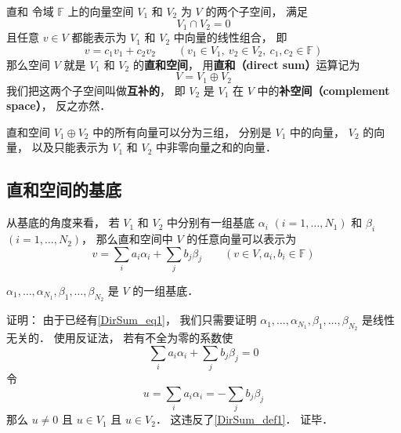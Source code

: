 
\begin{issues}
\issueTODO
\end{issues}

\begin{definition}{直和}\label{DirSum_def1}
令域 $\mathbb F$ 上的向量空间 $V_1$ 和 $V_2$ 为 $V$ 的两个子空间， 满足
\begin{equation}
V_1 \cap V_2 = \qty{0}
\end{equation}
且任意 ${v} \in V$ 都能表示为 $V_1$ 和 $V_2$ 中向量的线性组合， 即
\begin{equation}
{v} = c_1 {v_1} + c_2 {v_2}
\qquad
({v_1} \in V_1,\ {v_2} \in V_2,\ c_1, c_2 \in \mathbb F)
\end{equation}
那么空间 $V$ 就是 $V_1$ 和 $V_2$ 的\textbf{直和空间}， 用\textbf{直和（direct sum）}运算记为
\begin{equation}
V = V_1 \oplus V_2
\end{equation}
我们把这两个子空间叫做\textbf{互补的}， 即 $V_2$ 是 $V_1$ 在 $V$ 中的\textbf{补空间（complement space）}， 反之亦然．
\end{definition}

直和空间 $V_1 \oplus V_2$ 中的所有向量可以分为三组， 分别是 $V_1$ 中的向量， $V_2$ 的向量， 以及只能表示为 $V_1$ 和 $V_2$ 中非零向量之和的向量．

\subsection{直和空间的基底}
从基底的角度来看， 若 $V_1$ 和 $V_2$ 中分别有一组基底 ${\alpha_i}$ $(i = 1, \dots, N_1)$ 和 ${\beta_i}$ $(i = 1, \dots, N_2)$， 那么直和空间中 $V$ 的任意向量可以表示为
\begin{equation}\label{DirSum_eq1}
{v} = \sum_i a_i {\alpha_i} + \sum_j b_j {\beta_j} \qquad (v\in V, a_i, b_i \in \mathbb F)
\end{equation}
\begin{theorem}{}\label{DirSum_the1}
$\alpha_1, \dots, \alpha_{N_1}, \beta_1, \dots, \beta_{N_2}$ 是 $V$ 的一组基底．
\end{theorem}

证明： 由于已经有\autoref{DirSum_eq1}， 我们只需要证明 $\alpha_1, \dots, \alpha_{N_1}, \beta_1, \dots, \beta_{N_2}$ 是线性无关的． 使用反证法， 若有不全为零的系数使
\begin{equation}
\sum_i a_i {\alpha_i} + \sum_j b_j {\beta_j} = 0
\end{equation}
令
\begin{equation}
u = \sum_i a_i {\alpha_i} = -\sum_j b_j {\beta_j}
\end{equation}
那么 $u \ne 0$ 且 $u \in V_1$ 且 $u \in V_2$． 这违反了\autoref{DirSum_def1}． 证毕．

